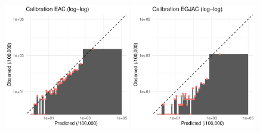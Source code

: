 \documentclass[12pt]{article}
\begin{document}
\begin{figure}[h]
\centering
\includegraphics[width=0.49\textwidth]{figures/EAC_calibration50_bar_log.pdf}
\includegraphics[width=0.49\textwidth]{figures/EGJAC_calibration50_bar_log.pdf}
\end{figure}


\clearpage
\end{document}
